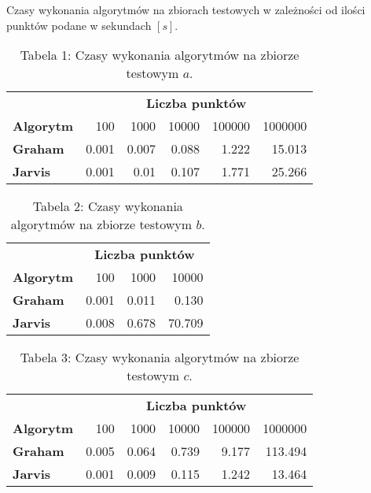 \quad Czasy wykonania algorytmów na zbiorach testowych w zależności od ilości punktów podane w sekundach $[s]$.
\renewcommand{\arraystretch}{2}
\begin{table}[!ht]
    \centering
\begin{tabular}{l  r|r|r|r|r|}
    & \multicolumn{5}{c}{\textbf{Liczba punktów}} \\ \cline{2-6}     
    \multicolumn{1}{l|}{\textbf{Algorytm}} & 100& 1000& 10000& 100000& 1000000 \\
   \hline
   \hline
   \multicolumn{1}{l|}{\textbf{Graham}} & 0.001& 0.007& 0.088& 1.222& 15.013 \\
   \hline
   \multicolumn{1}{l|}{\textbf{Jarvis}} & 0.001& 0.01& 0.107& 1.771& 25.266 \\
   \cline{2-6}
\end{tabular}
\caption*{Tabela 1: Czasy wykonania algorytmów na zbiorze testowym $a$.}
\end{table}


\begin{table}[!ht]
    \centering
\begin{tabular}{l  r|r|r|}
    & \multicolumn{3}{c}{\textbf{Liczba punktów}} \\ \cline{2-4}     
    \multicolumn{1}{l|}{\textbf{Algorytm}} & 100& 1000& 10000 \\
   \hline
   \hline
   \multicolumn{1}{l|}{\textbf{Graham}} & 0.001& 0.011& 0.130 \\
   \hline
   \multicolumn{1}{l|}{\textbf{Jarvis}} & 0.008& 0.678& 70.709 \\
   \cline{2-4}
\end{tabular}
\caption*{Tabela 2: Czasy wykonania algorytmów na zbiorze testowym $b$.}
\end{table}


\begin{table}[!ht]
    \centering
\begin{tabular}{l  r|r|r|r|r|}
    & \multicolumn{5}{c}{\textbf{Liczba punktów}} \\ \cline{2-6}     
    \multicolumn{1}{l|}{\textbf{Algorytm}} & 100& 1000& 10000& 100000& 1000000 \\
   \hline
   \hline
   \multicolumn{1}{l|}{\textbf{Graham}} & 0.005& 0.064& 0.739& 9.177& 113.494 \\
   \hline
   \multicolumn{1}{l|}{\textbf{Jarvis}} & 0.001& 0.009& 0.115& 1.242& 13.464 \\
   \cline{2-6}
\end{tabular}
\caption*{Tabela 3: Czasy wykonania algorytmów na zbiorze testowym $c$.}
\end{table}


